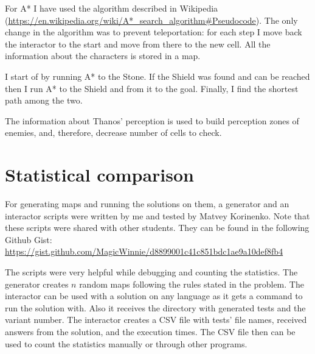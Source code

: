 \documentclass{article}
\begin{document}
For A* I have used the algorithm described in Wikipedia (\url{https://en.wikipedia.org/wiki/A*_search_algorithm#Pseudocode}). The only change in the algorithm was to prevent teleportation: for each step I move back the interactor to the start and move from there to the new cell.
All the information about the characters is stored in a map.

I start of by running A* to the Stone. If the Shield was found and can be reached then I run A* to the Shield and from it to the goal.
Finally, I find the shortest path among the two.

The information about Thanos' perception is used to build perception zones of enemies, and, therefore, decrease number of cells to check.

\section{Statistical comparison}
For generating maps and running the solutions on them, a generator and an interactor scripts were written by me and tested by Matvey Korinenko. Note that these scripts were shared with other students. They can be found in the following Github Gist: \url{https://gist.github.com/MagicWinnie/d8899001c41c851bdc1ae9a10def8fb4}

The scripts were very helpful while debugging and counting the statistics.
The generator creates $n$ random maps following the rules stated in the problem.
The interactor can be used with a solution on any language as it gets a command to run the solution with. Also it receives the directory with generated tests and the variant number. The interactor creates a CSV file with tests' file names, received answers from the solution, and the execution times.
The CSV file then can be used to count the statistics manually or through other programs.
\end{document}
